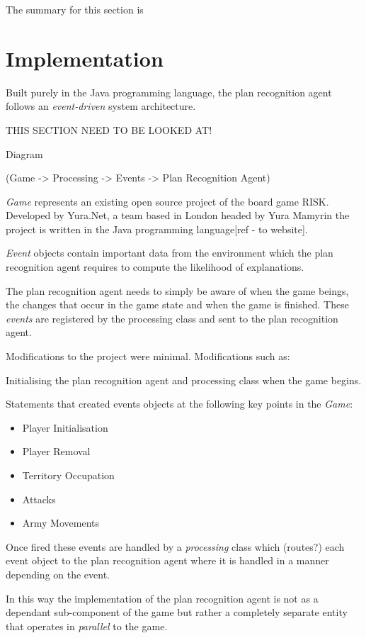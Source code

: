 \documentclass[parskip]{cs4rep}
\begin{document}
The summary for this section is

\chapter{Implementation}

Built purely in the Java programming language, the plan recognition agent follows an \textit{event-driven} system architecture.

THIS SECTION NEED TO BE LOOKED AT!

Diagram 

(Game -> Processing -> Events -> Plan Recognition Agent)

\textit{Game} represents an existing open source project of the board game RISK. Developed by Yura.Net, a team based in London headed by Yura Mamyrin the project is written in the Java programming language[ref - to website].

\textit{Event} objects contain important data from the environment which the plan recognition agent requires to compute the likelihood of explanations. 

The plan recognition agent needs to simply be aware of when the game beings, the changes that occur in the game state and when the game is finished. These \textit{events} are registered by the processing class and sent to the plan recognition agent.

Modifications to the project were minimal. Modifications such as:

Initialising the plan recognition agent and processing class when the game begins.

Statements that created events objects at the following key points in the \textit{Game}:

\begin{itemize}
\item
Player Initialisation
\item
Player Removal
\item
Territory Occupation
\item
Attacks
\item
Army Movements
\end{itemize}

Once fired these events are handled by a \textit{processing} class which (routes?) each event object to the plan recognition agent where it is handled in a manner depending on the event.

In this way the implementation of the plan recognition agent is not as a dependant sub-component of the game but rather a completely separate entity that operates in \textit{parallel} to the game.
\end{document}
